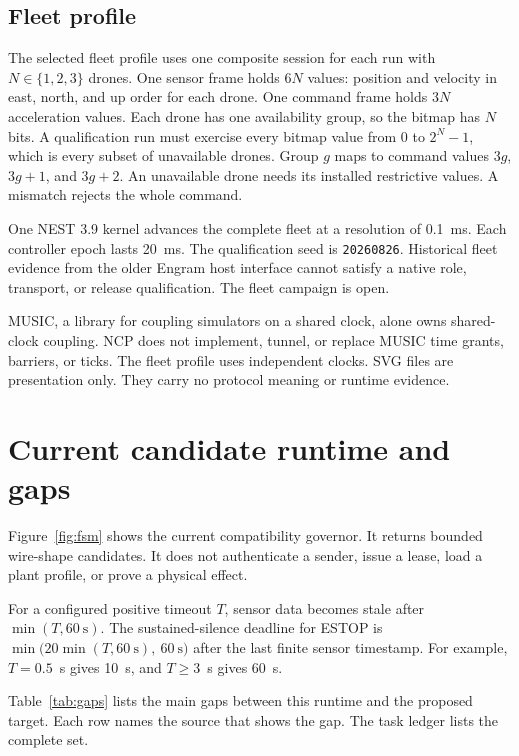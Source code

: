 \documentclass[11pt,a4paper]{article}
\theoremstyle{definition}
\let\NcpTextttBase\texttt
\renewcommand{\texttt}[1]{\mbox{\NcpTextttBase{#1}}}
\begin{document}
\subsection{Fleet profile}

The selected fleet profile uses one composite session for each run with $N\in\{1,2,3\}$
drones. One sensor frame holds $6N$ values: position and velocity in east, north, and
up order for each drone. One command frame holds $3N$ acceleration values. Each drone
has one availability group, so the bitmap has $N$ bits. A qualification run must
exercise every bitmap value from 0 to $2^N-1$, which is every subset of unavailable
drones. Group $g$ maps to command values $3g$, $3g+1$, and $3g+2$. An
unavailable drone needs its installed restrictive values. A mismatch rejects the whole
command.

One NEST 3.9 kernel advances the complete fleet at a resolution of 0.1~ms. Each
controller epoch lasts 20~ms. The qualification seed is \texttt{20260826}. Historical
fleet evidence from the older Engram host interface cannot satisfy a native role,
transport, or release qualification. The fleet campaign is open.

MUSIC, a library for coupling simulators on a shared clock, alone owns shared-clock
coupling. NCP does not implement, tunnel, or replace MUSIC time grants, barriers, or
ticks. The fleet profile uses independent clocks. SVG files are presentation only. They
carry no protocol meaning or runtime evidence.

\section{Current candidate runtime and gaps}\label{sec:gaps}


Figure~\ref{fig:fsm} shows the current compatibility governor. It returns bounded
wire-shape candidates. It does not authenticate a sender, issue a lease, load a plant
profile, or prove a physical effect.

For a configured positive timeout $T$, sensor data becomes stale after
$\min(T,60\ \mathrm{s})$. The sustained-silence deadline for ESTOP is
$\min\bigl(20\min(T,60\ \mathrm{s}),\ 60\ \mathrm{s}\bigr)$ after the last finite sensor
timestamp. For example, $T=0.5$~s gives 10~s, and $T\geq3$~s gives 60~s.

Table~\ref{tab:gaps} lists the main gaps between this runtime and the proposed target.
Each row names the source that shows the gap. The task ledger lists the complete set.
\end{document}
